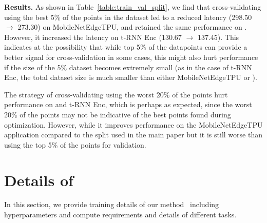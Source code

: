 {\textbf{Results.} As shown in Table~\ref{table:train_val_split}, we find that cross-validating using the best 5\% of the points in the dataset led to a reduced latency (298.50 $\rightarrow$ 273.30) on MobileNetEdgeTPU, and retained the same performance on \msix. However, it increased the latency on t-RNN Enc (130.67 $\rightarrow$ 137.45). This indicates at the possibility that while top 5\% of the datapoints can provide a better signal for cross-validation in some cases, this might also hurt performance if the size of the 5\% dataset becomes extremely small (as in the case of t-RNN Enc, the total dataset size is much smaller than either MobileNetEdgeTPU or \msix).}

{The strategy of cross-validating using the worst 20\% of the points hurt performance on \msix and t-RNN Enc, which is perhaps as expected, since the worst 20\% of the points may not be indicative of the best points found during optimization. However, while it improves performance on the MobileNetEdgeTPU application compared to the split used in the main paper but it is still worse than using the top 5\% of the points for validation.}
%
\begin{table}[H]
\small
\centering
\caption{}
\label{table:train_val_split}
\vspace{-0.1cm}
\end{table}
%


\section{Details of \primemethodname}
\label{app:prime_details}
%
In this section, we provide training details of our method \primemethodname\ including hyperparameters and compute requirements and details of different tasks. 
%
